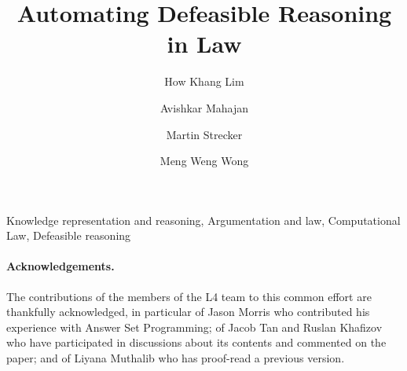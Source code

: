 \documentclass{tlp}
\begin{document}


\title{Automating Defeasible Reasoning in Law}

\begin{authgrp}
\author{How Khang Lim} %
\author{Avishkar Mahajan} %
\author{Martin Strecker} %
\author{Meng Weng Wong} %
\end{authgrp}


\maketitle

\begin{abstract}

\end{abstract}

\begin{keywords}
  Knowledge representation and reasoning,
  Argumentation and law,
  Computational Law,
  Defeasible reasoning
\end{keywords}





% 









\paragraph{Acknowledgements.}
The contributions of the members of the L4 team to this common effort are
thankfully acknowledged, in particular of Jason Morris who contributed his
experience with Answer Set Programming; of Jacob Tan and Ruslan Khafizov who
have participated in discussions about its contents and commented on the
paper; and of Liyana Muthalib who has proof-read a previous version.
\end{document}
